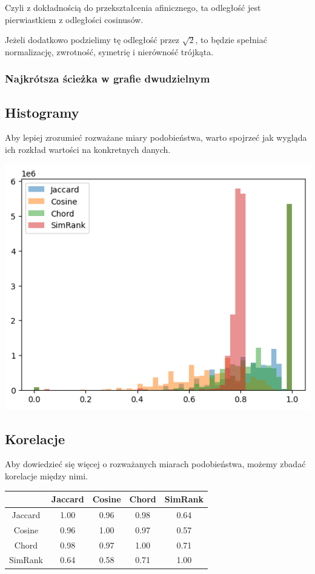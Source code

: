 \documentclass{article}
\begin{document}
Czyli z dokładnością do przekształcenia afinicznego, ta odległość jest
pierwiastkiem z odległości cosinusów.

Jeżeli dodatkowo podzielimy tę odległość przez $\sqrt 2$, to będzie spełniać
normalizację, zwrotność, symetrię i nierówność trójkąta.

\subsubsection{Najkrótsza ścieżka w grafie dwudzielnym}

\subsection{Histogramy}

Aby lepiej zrozumieć rozważane miary podobieństwa, warto spojrzeć jak wygląda
ich rozkład wartości na konkretnych danych.

\noindent
\includegraphics[width=\textwidth]{dist_hist.png}

\subsection{Korelacje}

Aby dowiedzieć się więcej o rozważanych miarach podobieństwa, możemy zbadać
korelacje między nimi.

\begin{center}
\begin{tabular}{|c|cccc|}
  \hline
    & Jaccard & Cosine & Chord & SimRank \\
  \hline
  Jaccard & 1.00 & 0.96 & 0.98 & 0.64 \\
  Cosine  & 0.96 & 1.00 & 0.97 & 0.57 \\
  Chord   & 0.98 & 0.97 & 1.00 & 0.71 \\
  SimRank & 0.64 & 0.58 & 0.71 & 1.00 \\
  \hline
\end{tabular}
\end{center}
\end{document}
